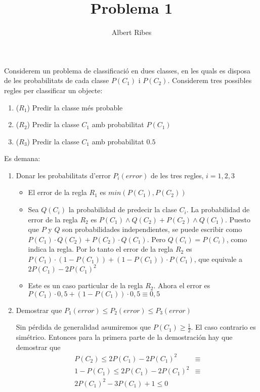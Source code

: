 \documentclass[a4paper]{article}
\author{Albert Ribes}
\title{Problema 1}
\begin{document}
  \maketitle
  Considerem un problema de classificació en dues classes, en les quals es disposa de les probabilitats de
  cada classe $P(C_1)$ i $P(C_2)$. Considerem tres possibles regles per classificar un objecte:
  \begin{enumerate}
    \item ($R_1$) Predir la classe més probable
    \item ($R_2$) Predir la classe $C_1$ amb probabilitat $P(C_1)$
    \item ($R_3$) Predir la classe $C_1$ amb probabilitat $0.5$
  \end{enumerate}
  Es demana:
  \begin{enumerate}
    \item Donar les probabilitats d'error $P_i(error)$ de les tres regles, $i = 1, 2, 3$
    {\bfseries
    \begin{itemize}
      \item El error de la regla $R_1$ es $min(P(C_1), P(C_2))$
      \item Sea $Q(C_i)$ la probabilidad de predecir la clase $C_i$. La probabilidad de error de la regla $R_2$ es $P(C_1) \wedge Q(C_2) + P(C_2) \wedge Q(C_1)$. Puesto que $P$ y $Q$ son probabilidades
      independientes, se puede escribir como $P(C_1) \cdot Q(C_2) + P(C_2) \cdot Q(C_1)$. Pero $Q(C_i) = P(C_i)$, como indica la regla. Por lo tanto el error de la regla $R_2$ es $P(C_1) \cdot (1 - P(C_1)) + (1 - P(C_1)) \cdot P(C_1)$, que equivale a $2P(C_1) - 2P(C_1)^2$
      \item Este es un caso particular de la regla $R_2$. Ahora el error es
      $P(C_1) \cdot 0,5 + (1 - P(C_1)) \cdot 0,5 \equiv 0,5$
    \end{itemize}

    }
    \item Demostrar que $P_1(error) \leq P_2(error) \leq P_3(error)$

    {\bfseries

    Sin pérdida de generalidad asumiremos que $P(C_1) \geq \frac{1}{2}$. El caso
    contrario es simétrico. Entonces para la primera parte de la demostración
    hay que demostrar que
    \begin{eqnarray*}
    P(C_2)  \leq 2P(C_1) - 2P(C_1)^2  & \equiv\\
    1 - P(C_1)  \leq 2P(C_1) - 2P(C_1)^2 & \equiv \\
    2P(C_1)^2 - 3P(C_1) + 1  \leq 0  &
    \end{eqnarray*}

}
\end{enumerate}
\end{document}
